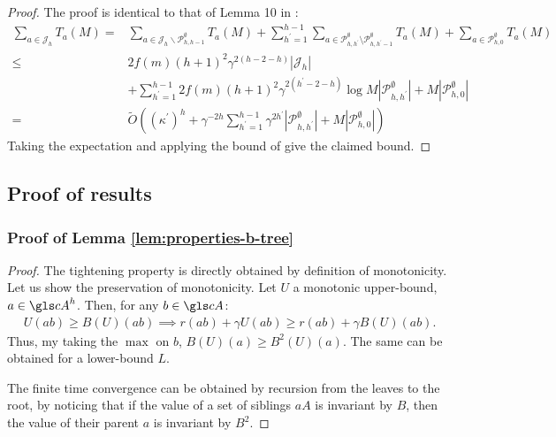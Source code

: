 \begin{subappendices}
\begin{proof}
	The proof is identical to that of Lemma 10 in \citep{Bubeck2010}:
	\begin{align*}
	\sum_{a \in \mathcal{J}_{h}} T_{a}(M) = {} & \sum_{a \in \mathcal{J}_{h} \backslash \mathcal{P}_{h, h-1}^{\emptyset}} T_{a}(M)+\sum_{h^{\prime}=1}^{h-1} \sum_{a \in \mathcal{P}_{h, h^{\prime}}^{\emptyset} \setminus \mathcal{P}_{h, h^{\prime}-1}^{\emptyset}} T_{a}(M)+\sum_{a \in \mathcal{P}_{h, 0}^{\emptyset}} T_{a}(M)\\
	\leq {} & 2f(m)(h+1)^{2} \gamma^{2(h-2-h)}\left|\mathcal{J}_{h}\right| \\
	 &+ \sum_{h^{\prime}=1}^{h-1} 2f(m)(h+1)^{2} \gamma^{2\left(h^{\prime}-2-h\right)} \log M\left|\mathcal{P}_{h, h^{\prime}}^{\emptyset}\right|+M\left|\mathcal{P}_{h, 0}^{\emptyset}\right|\\
	= {} &\tilde{O}\left(\left(\kappa^{\prime}\right)^{h}+\gamma^{-2 h} \sum_{h^{\prime}=1}^{h-1} \gamma^{2 h^{\prime}}\left|\mathcal{P}_{h, h^{\prime}}^{\emptyset}\right|+M\left|\mathcal{P}_{h, 0}^{\emptyset}\right|\right)
	\end{align*}
	Taking the expectation and applying the bound of  give the claimed bound.
	
\end{proof}


\subsection{Proof of \GBOP results}
\label{sec:gbop-proofs}

\subsubsection{Proof of Lemma \ref{lem:properties-b-tree}}
\begin{proof}
The tightening property is directly obtained by definition of monotonicity.
Let us show the preservation of monotonicity. Let $U$ a monotonic upper-bound, $a\in \cA^h$. Then, for any $b\in \cA$:
\begin{align*}
U(ab) \geq B(U)(ab) \implies 
r(ab) + \gamma U(ab) \geq r(ab) + \gamma B(U)(ab).
\end{align*}
Thus, my taking the $\max$ on $b$,
$
B(U)(a) \geq B^2(U)(a).
$
The same can be obtained for a lower-bound $L$.

The finite time convergence can be obtained by recursion from the leaves to the root, by noticing that if the value of a set of siblings $aA$ is invariant by $B$, then the value of their parent $a$ is invariant by $B^2$.
\end{proof}


\end{subappendices}
